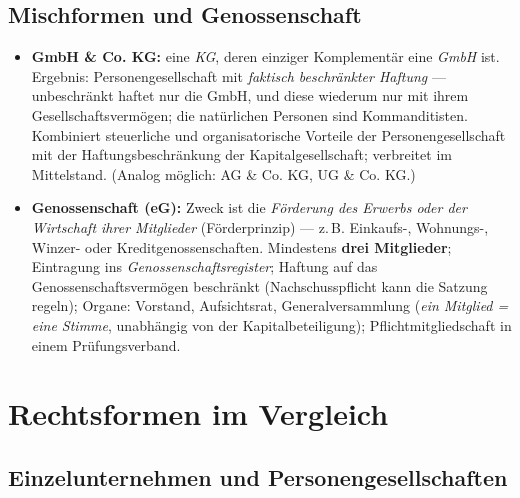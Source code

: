 \documentclass[11pt, a4paper]{article}
\begin{document}
\subsection{Mischformen und Genossenschaft}

\begin{itemize}
  \item \textbf{GmbH \& Co. KG:} eine \emph{KG}, deren einziger Komplementär eine
    \emph{GmbH} ist. Ergebnis: Personengesellschaft mit \emph{faktisch beschränkter
    Haftung} --- unbeschränkt haftet nur die GmbH, und diese wiederum nur mit ihrem
    Gesellschaftsvermögen; die natürlichen Personen sind Kommanditisten. Kombiniert
    steuerliche und organisatorische Vorteile der Personengesellschaft mit der
    Haftungsbeschränkung der Kapitalgesellschaft; verbreitet im Mittelstand.
    (Analog möglich: AG \& Co. KG, UG \& Co. KG.)
  \item \textbf{Genossenschaft (eG):} Zweck ist die \emph{Förderung des Erwerbs oder der
    Wirtschaft ihrer Mitglieder} (Förderprinzip) --- z.\,B. Einkaufs-, Wohnungs-,
    Winzer- oder Kreditgenossenschaften. Mindestens \textbf{drei Mitglieder}; Eintragung
    ins \emph{Genossenschaftsregister}; Haftung auf das Genossenschaftsvermögen
    beschränkt (Nachschusspflicht kann die Satzung regeln); Organe: Vorstand,
    Aufsichtsrat, Generalversammlung (\emph{ein Mitglied = eine Stimme}, unabhängig von
    der Kapitalbeteiligung); Pflichtmitgliedschaft in einem Prüfungsverband.
\end{itemize}

\section{Rechtsformen im Vergleich}

\subsection{Einzelunternehmen und Personengesellschaften}
\end{document}
